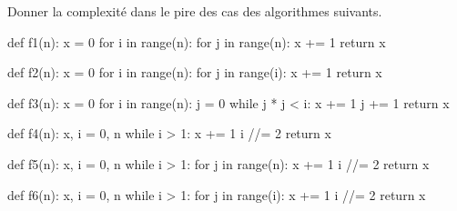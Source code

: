 Donner la complexité dans le pire des cas des algorithmes suivants.

\begin{pyverbatim}
def f1(n):
    x = 0
    for i in range(n):
        for j in range(n):
            x += 1
    return x
\end{pyverbatim}

\begin{pyverbatim}
def f2(n):
    x = 0
    for i in range(n):
        for j in range(i):
            x += 1
    return x
\end{pyverbatim}

\begin{pyverbatim}
def f3(n):
    x = 0
    for i in range(n):
        j = 0
        while j * j < i:
            x += 1
            j += 1
    return x
\end{pyverbatim}


\begin{pyverbatim}
def f4(n):
    x, i = 0, n
    while i > 1:
        x += 1
        i //= 2
    return x
\end{pyverbatim}


\begin{pyverbatim}
def f5(n):
    x, i = 0, n
    while i > 1:
        for j in range(n):
            x += 1
        i //= 2
    return x
\end{pyverbatim}


\begin{pyverbatim}
def f6(n):
    x, i = 0, n
    while i > 1:
        for j in range(i):
            x += 1
        i //= 2
    return x
\end{pyverbatim}